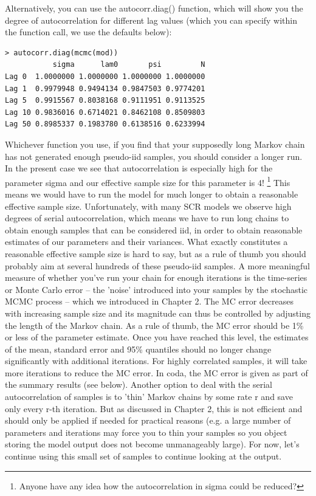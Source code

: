 Alternatively, you can use the autocorr.diag() function, which will show you the degree of autocorrelation for different lag values (which you can specify within the function call, we use the defaults below):
\begin{verbatim}
> autocorr.diag(mcmc(mod))
           sigma      lam0       psi         N
Lag 0  1.0000000 1.0000000 1.0000000 1.0000000
Lag 1  0.9979948 0.9494134 0.9847503 0.9774201
Lag 5  0.9915567 0.8038168 0.9111951 0.9113525
Lag 10 0.9836016 0.6714021 0.8462108 0.8509803
Lag 50 0.8985337 0.1983780 0.6138516 0.6233994
\end{verbatim}
Whichever function you use, if you find that your supposedly long Markov chain has not generated enough pseudo-iid samples, you should consider a longer run. In the present case we see that autocorrelation is especially high for the parameter sigma and our effective sample size for this parameter is 4! \footnote{Anyone have any idea how the autocorrelation in sigma could be reduced?} This means we would have to run the model for much longer to obtain a reasonable effective sample size. Unfortunately, with many SCR models we observe high degrees of serial autocorrelation, which means we have to run long chains to obtain enough samples that can be considered iid, in order to obtain reasonable estimates of our parameters and their variances.
What exactly constitutes a reasonable effective sample size is hard to say, but as a rule of thumb you should probably aim at several hundreds of these pseudo-iid samples. A more meaningful measure of whether you've run your chain for enough iterations is the time-series or Monte Carlo error – the 'noise' introduced into your samples by the stochastic MCMC process – which we introduced in Chapter 2. The MC error decreases with increasing sample size and its magnitude can thus be controlled by adjusting the length of the Markov chain. As a rule of thumb, the MC error should be 1\% or less of the parameter estimate. Once you have reached this level, the estimates of the mean, standard error and 95\% quantiles should no longer change significantly with additional iterations. For highly correlated samples, it will take more iterations to reduce the MC error. In coda, the MC error is given as part of the summary results (see below).
 Another option to deal with the serial autocorrelation of samples is to 'thin' Markov chains by some rate r and save only every r-th iteration. But as discussed in Chapter 2, this is not efficient and should only be applied if needed for practical reasons (e.g. a large number of parameters and iterations may force you to thin your samples so you object storing the model output does not become unmanageably large).
For now, let's continue using this small set of samples to continue looking at the output.

